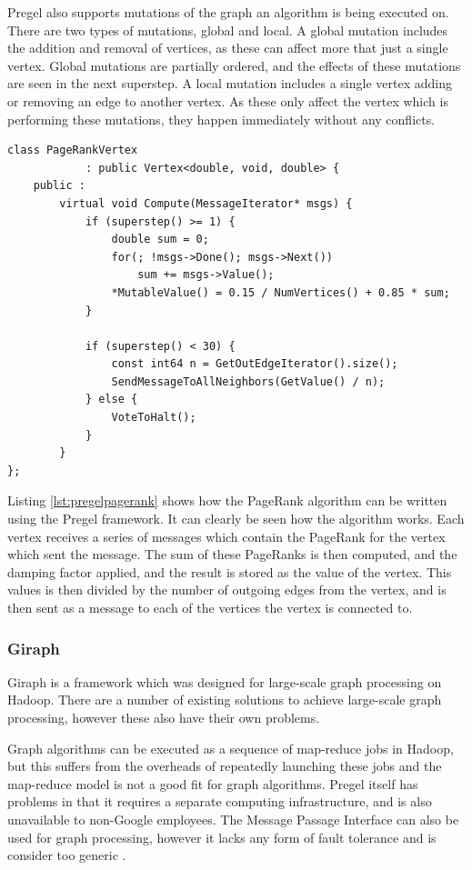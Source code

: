 Pregel also supports mutations of the graph an algorithm is being executed on. There are two types of mutations, global and local. A global mutation includes the addition and removal of vertices, as these can affect more that just a single vertex. Global mutations are partially ordered, and the effects of these mutations are seen in the next superstep. A local mutation includes a single vertex adding or removing an edge to another vertex. As these only affect the vertex which is performing these mutations, they happen immediately without any conflicts.

\begin{lstlisting}[float]
class PageRankVertex
			: public Vertex<double, void, double> {
	public :	
		virtual void Compute(MessageIterator* msgs) {
			if (superstep() >= 1) {
				double sum = 0;
				for(; !msgs->Done(); msgs->Next())
					sum += msgs->Value();
				*MutableValue() = 0.15 / NumVertices() + 0.85 * sum;
			}
			
			if (superstep() < 30) {
				const int64 n = GetOutEdgeIterator().size();
				SendMessageToAllNeighbors(GetValue() / n);
			} else {
				VoteToHalt();
			}
		}
};					
\end{lstlisting} 

Listing \ref{lst:pregelpagerank} shows how the PageRank algorithm \cite{pagerank} can be written using the Pregel framework. It can clearly be seen how the algorithm works. Each vertex receives a series of messages which contain the PageRank for the vertex which sent the message. The sum of these PageRanks is then computed, and the damping factor applied, and the result is stored as the value of the vertex. This values is then divided by the number of outgoing edges from the vertex, and is then sent as a message to each of the vertices the vertex is connected to.

\subsubsection{Giraph}
Giraph is a framework which was designed for large-scale graph processing on Hadoop. There are a number of existing solutions to achieve large-scale graph processing, however these also have their own problems.

Graph algorithms can be executed as a sequence of map-reduce jobs in Hadoop, but this suffers from the overheads of repeatedly launching these jobs and the map-reduce model is not a good fit for graph algorithms. Pregel itself has problems in that it requires a separate computing infrastructure, and is also unavailable to non-Google employees. The Message Passage Interface can also be used for graph processing, however it lacks any form of fault tolerance and is consider too generic \cite{giraphtalk}.

